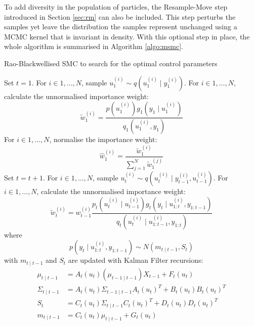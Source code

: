 To add diversity in the population of particles, the Resample-Move step introduced in Section \ref{sec:rm} can also be included. This step perturbs the samples yet leave the distribution the samples represent unchanged using a MCMC kernel that is invariant in density. With this optional step in place, the whole algorithm is summarised in Algorithm \ref{algo:msmc}.

\begin{algorithm}
\caption{Rao-Blackwellised SMC to search for the optimal control parameters}\label{algo:msmc}
\begin{algorithmic}[1]
\State Set $t = 1$.
\State For $i \in 1, \ldots, N$, sample $u^{(i)}_1 \sim q(u^{(i)}_1 \mid y^{(i)}_1)$.
\State For $i \in 1, \ldots, N$, calculate the unnormalised importance weight:
\begin{equation*}
 \tilde{w}^{(i)}_1 = \dfrac{p(u_1^{(i)})g_1(y_1 \mid u^{(i)}_1)}{q_1(u^{(i)}_1, y_1)}
\end{equation*}
\State For $i \in 1, \ldots, N$, normalise the importance weight:
\begin{equation*}
\hat{w}^{(i)}_1 = \dfrac{\tilde{w}^{(i)}_1}{\sum^N_{j=1} \tilde{w}^{(j)}_1}
\end{equation*}
\State Set $t = t + 1$.
\State For $i \in 1, \ldots, N$, sample $u^{(i)}_t \sim q(u^{(i)}_t \mid y^{(i)}_{t-1}, u^{(i)}_{t-1})$.
\State For $i \in 1, \ldots, N$, calculate the unnormalised importance weight:
\begin{equation*}
   \tilde{w}^{(i)}_t = w^{(i)}_{t-1} \dfrac{p_t(u^{(i)}_t \mid u^{(i)}_{t-1})g_t(y_t \mid u^{(i)}_{1:t}, y_{1:t-1})}{q_t(u^{(i)}_t \mid u^{(i)}_{1:t-1}, y_{1:t})}
\end{equation*}
where
\begin{equation}
  p(y_t \mid u^{(i)}_{1:t}, y_{1:t-1}) \sim N(m_{t \mid t-1},S_t)
\end{equation}
with $m_{t \mid t-1}$ and $S_t$ are updated with Kalman Filter recursions:
\begin{align}
  \mu_{t \mid t -1} &= A_{t}(u_t)(\mu_{t-1 \mid t-1})X_{t-1} + F_t(u_t) \nonumber \\
  \Sigma_{t \mid t -1} &= A_{t}(u_t)\Sigma_{t -1 \mid t -1}A_{t}(u_t)^T +  B_t(u_t)B_t(u_t)^T \nonumber\\
  S_t &=  C_{t}(u_t)\Sigma_{t \mid t -1}C_{t}(u_t)^T +  D_t(u_t)D_t(u_t)^T \nonumber\\
  m_{t \mid t-1} &=  C_{t}(u_t)  \mu_{t \mid t-1} + G_t(u_t) \nonumber\\

\end{align}
\end{algorithmic}
\end{algorithm}
